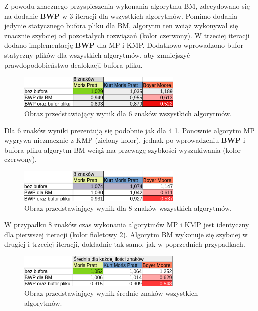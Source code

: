 Z powodu znacznego przyspieszenia wykonania algorytmu BM, zdecydowano się na
dodanie \textbf{BWP} w 3 iteracji dla wszystkich algorytmów. Pomimo dodania jedynie 
statycznego bufora pliku dla BM, algorytm ten wciąż wykonywał się znacznie
szybciej od pozostałych rozwiązań (kolor czerwony). W trzeciej iteracji dodano implementację 
\textbf{BWP} dla MP i KMP. Dodatkowo wprowadzono bufor statyczny
plików dla wszystkich algorytmów, aby zmniejszyć
prawdopodobieństwo dealokacji bufora pliku.

\begin{figure}[htb]
    \centering
    \includegraphics[width=0.7\textwidth]{./images/tabela-algo-6-znakow.png}
    \caption{Obraz przedstawiający wynik dla 6 znaków wszystkich algorytmów.}
    \label{fig:algo6znakowTabela}
\end{figure}

Dla 6 znaków wyniki prezentują się podobnie jak dla 4 
\ref{fig:algo6znakowTabela}. Ponownie algorytm MP wygrywa nieznacznie z KMP 
(zielony kolor), jednak po wprowadzeniu \textbf{BWP} i bufora pliku algorytm BM
wciąż ma przewagę szybkości wyszukiwania (kolor czerwony).

\begin{figure}[htb]
    \centering
    \includegraphics[width=0.7\textwidth]{./images/tabela-algo-8-znakow.png}
    \caption{Obraz przedstawiający wynik dla 8 znaków wszystkich algorytmów.}
    \label{fig:algo8znakowTabela}
\end{figure}

W przypadku 8 znaków czas wykonania algorytmów MP i KMP jest identyczny dla
pierwszej iteracji (kolor fioletowy \ref{fig:algo8znakowTabela}). Algorytm 
BM wykonuje się szybciej w drugiej i trzeciej iteracji, dokładnie tak samo,
jak w poprzednich przypadkach.

\begin{figure}[htb]
    \centering
    \includegraphics[width=0.7\textwidth]{./images/tabela-algo-srednia.png}
    \caption{Obraz przedstawiający wynik średnie znaków wszystkich algorytmów.}
    \label{fig:algoAvgTabela}
\end{figure}

